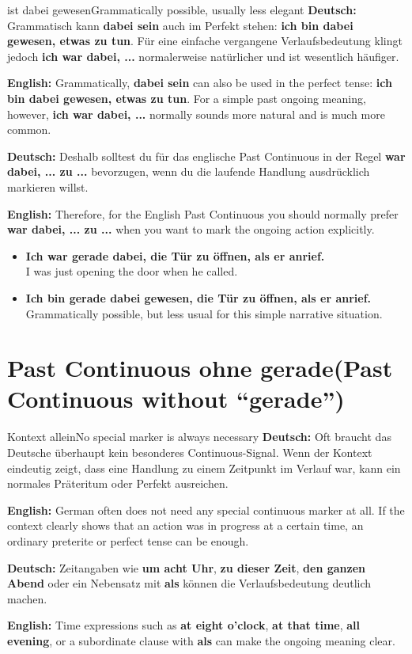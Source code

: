 \documentclass[a4paper,11pt]{article}
\newcommand{\GermanText}[1]{\textbf{Deutsch: }#1\par}
\newcommand{\EnglishText}[1]{{\small\color{SoftGray}\textbf{English: }#1\par}}
\newcommand{\ExampleItem}[2]{\item \textbf{#1}\\{\small\color{SoftGray}#2}}
\begin{document}
        \begin{grammarentry}{ist dabei gewesen}{Grammatically possible, usually less elegant}
            \GermanText{Grammatisch kann \textbf{dabei sein} auch im Perfekt stehen: \textbf{ich bin dabei gewesen, etwas zu tun}. Für eine einfache vergangene Verlaufsbedeutung klingt jedoch \textbf{ich war dabei, ...} normalerweise natürlicher und ist wesentlich häufiger.}
            \EnglishText{Grammatically, \textbf{dabei sein} can also be used in the perfect tense: \textbf{ich bin dabei gewesen, etwas zu tun}. For a simple past ongoing meaning, however, \textbf{ich war dabei, ...} normally sounds more natural and is much more common.}

            \GermanText{Deshalb solltest du für das englische Past Continuous in der Regel \textbf{war dabei, ... zu ...} bevorzugen, wenn du die laufende Handlung ausdrücklich markieren willst.}
            \EnglishText{Therefore, for the English Past Continuous you should normally prefer \textbf{war dabei, ... zu ...} when you want to mark the ongoing action explicitly.}
        \end{grammarentry}

        \begin{exbox}
            \begin{itemize}
                \ExampleItem{Ich war gerade dabei, die Tür zu öffnen, als er anrief.}{I was just opening the door when he called.}
                \ExampleItem{Ich bin gerade dabei gewesen, die Tür zu öffnen, als er anrief.}{Grammatically possible, but less usual for this simple narrative situation.}
            \end{itemize}
        \end{exbox}

\section{Past Continuous ohne \glqq gerade\grqq \textnormal{(Past Continuous without ``gerade'')}}

        \begin{grammarentry}{Kontext allein}{No special marker is always necessary}
            \GermanText{Oft braucht das Deutsche überhaupt kein besonderes Continuous-Signal. Wenn der Kontext eindeutig zeigt, dass eine Handlung zu einem Zeitpunkt im Verlauf war, kann ein normales Präteritum oder Perfekt ausreichen.}
            \EnglishText{German often does not need any special continuous marker at all. If the context clearly shows that an action was in progress at a certain time, an ordinary preterite or perfect tense can be enough.}

            \GermanText{Zeitangaben wie \textbf{um acht Uhr}, \textbf{zu dieser Zeit}, \textbf{den ganzen Abend} oder ein Nebensatz mit \textbf{als} können die Verlaufsbedeutung deutlich machen.}
            \EnglishText{Time expressions such as \textbf{at eight o'clock}, \textbf{at that time}, \textbf{all evening}, or a subordinate clause with \textbf{als} can make the ongoing meaning clear.}
        \end{grammarentry}
\end{document}
